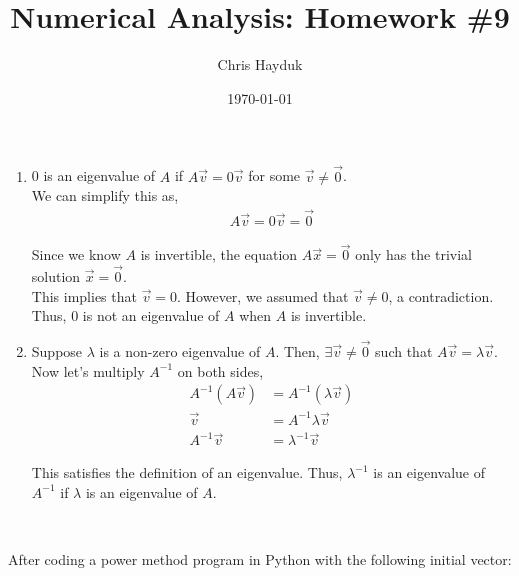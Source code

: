 \documentclass[12pt]{article}
\newenvironment{problem}[2][Problem]{\begin{trivlist}
\item[\hskip \labelsep {\bfseries #1}\hskip \labelsep {\bfseries #2.}]}{\end{trivlist}}
\begin{document}
\title{Numerical Analysis: Homework \#9}

\author{Chris Hayduk}
\date{\today}

\maketitle

\begin{problem}{1}
\end{problem}

\begin{enumerate}
	\item[a)] 0 is an eigenvalue of $A$ if $A\vec{v} = 0\vec{v}$ for some $\vec{v} \neq \vec{0}$.\\
	
	We can simplify this as,
	\begin{align*}
		A\vec{v} = 0\vec{v} = \vec{0}
	\end{align*}
	
	Since we know $A$ is invertible, the equation $A\vec{x} = \vec{0}$ only has the trivial solution $\vec{x} = \vec{0}$.\\
	
	This implies that $\vec{v} = 0$. However, we assumed that $\vec{v} \neq 0$, a contradiction. Thus, 0 is not an eigenvalue of $A$ when $A$ is invertible.
	
	\item[b)] Suppose $\lambda$ is a non-zero eigenvalue of $A$. Then, $\exists \vec{v} \neq \vec{0}$ such that $A\vec{v} = \lambda\vec{v}$.\\
	
	Now let's multiply $A^{-1}$ on both sides,
	\begin{align*}
		A^{-1}(A\vec{v}) &= A^{-1}(\lambda\vec{v})\\
		\vec{v} &= A^{-1}\lambda\vec{v}\\
		A^{-1}\vec{v} &= \lambda^{-1}\vec{v}
	\end{align*}
	
	This satisfies the definition of an eigenvalue. Thus, $\lambda^{-1}$ is an eigenvalue of $A^{-1}$ if $\lambda$ is an eigenvalue of $A$.
\end{enumerate}
\\
\begin{problem}{2}
\end{problem}

After coding a power method program in Python with the following initial vector:\\
\end{document}
